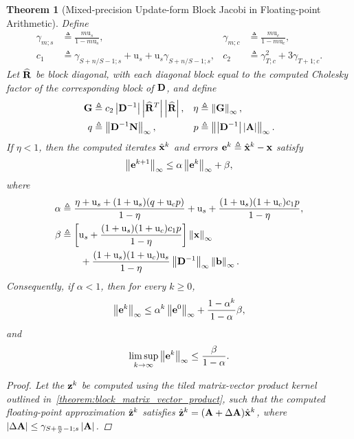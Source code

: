 \documentclass[11pt,draft]{article}
\newcommand{\urd}{\ensuremath{\mathrm{u}}}
\newcommand{\define}{\ensuremath{\triangleq}}
\newcommand{\vect}[1]{\mathbf{\MakeLowercase{#1}}}
\newcommand{\mat}[1]{\mathbf{\MakeUppercase{#1}}}
\newcommand{\norm}[2][]{\left\|#2\right\|_{#1}}
\newtheorem{theorem}{Theorem}[section]
\theoremstyle{definition}
\theoremstyle{remark}
\newcommand{\abs}[1]{\left|#1\right|}
\begin{document}
\begin{theorem}[Mixed-precision Update-form Block Jacobi in Floating-point Arithmetic]
Define
\begin{align}
    \gamma_{m;s}
    &\define \frac{m\urd_s}{1-m\urd_s},
    &
    \gamma_{m;c}
    &\define \frac{m\urd_c}{1-m\urd_c},
    \\
    c_1
    &\define
    \gamma_{S+n/S-1;s}
    +\urd_s
    +\urd_s\gamma_{S+n/S-1;s},
    &
    c_2
    &\define \gamma_{T;c}^2+3\gamma_{T+1;c}.
\end{align}
Let $\widehat{\mat{r}}$ be block diagonal, with each diagonal block equal
to the computed Cholesky factor of the corresponding block of $\mat{d}$,
and define
\begin{align}
    \mat{g}
    &\define
    c_2\abs{\mat{d}^{-1}}
    \abs{\widehat{\mat{r}}^T}
    \abs{\widehat{\mat{r}}},
    &
    \eta
    &\define \norm[\infty]{\mat{g}},
    \\
    q
    &\define \norm[\infty]{\mat{d}^{-1}\mat{n}},
    &
    p
    &\define
    \norm[\infty]{\abs{\mat{d}^{-1}}\abs{\mat{a}}}.
\end{align}
If $\eta<1$, then the computed iterates
$\hat{\vect{x}}^k$ and errors
$\vect{e}^k\define\hat{\vect{x}}^k-\vect{x}$ satisfy
\begin{align}
    \norm[\infty]{\vect{e}^{k+1}}
    \leq
    \alpha\norm[\infty]{\vect{e}^k}+\beta,
\end{align}
where
\begin{align}
    \alpha
    &\define
    \frac{
        \eta+\urd_s+(1+\urd_s)(q+\urd_c p)
    }{1-\eta}
    +\urd_s
    +\frac{(1+\urd_s)(1+\urd_c)c_1p}{1-\eta},
    \\
    \beta
    &\define
    \left[
        \urd_s
        +\frac{(1+\urd_s)(1+\urd_c)c_1p}{1-\eta}
    \right]
    \norm[\infty]{\vect{x}}
    \\
    &\qquad
    +\frac{(1+\urd_s)(1+\urd_c)\urd_s}{1-\eta}
     \norm[\infty]{\mat{d}^{-1}}
     \norm[\infty]{\vect{b}}.
\end{align}
Consequently, if $\alpha<1$, then for every $k\geq0$,
\begin{align}
    \norm[\infty]{\vect{e}^{k}}
    \leq
    \alpha^k\norm[\infty]{\vect{e}^{0}}
    +\frac{1-\alpha^k}{1-\alpha}\beta,
\end{align}
and
\begin{align}
    \limsup_{k\to\infty}
    \norm[\infty]{\vect{e}^{k}}
    \leq \frac{\beta}{1-\alpha}.
\end{align}
    \begin{proof}
       Let the $\vect{z}^k$ be computed using the tiled matrix-vector product kernel outlined in~\cref{theorem:block_matrix_vector_product}, such that the computed floating-point approximation $\hat{\vect{z}}^k$ satisfies $\hat{\vect{z}}^k = (\mat{a}+\Delta \mat{a})\hat{\vect{x}}^k$, where $\abs{\Delta \mat{a}} \leq \gamma_{S + \frac{n}{S} - 1;s} \abs{\mat{a}}$.

\end{proof}
\end{theorem}
\end{document}
